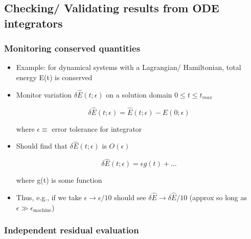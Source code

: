 \subsection{Checking/ Validating results from ODE integrators}

\subsubsection{Monitoring conserved quantities}
\begin{itemize}
    \item Example: for dynamical systems with a Lagrangian/ Hamiltonian, total energy E(t) is conserved

    \item Monitor variation $\delta \hat{E} (t;\epsilon)$ on a solution domain $0 \le t \le t_{max}$

    \[ \delta \hat{E}(t;\epsilon) = \hat{E}(t;\epsilon)-\hat{E}(0;\epsilon)\]

    where $\epsilon \equiv $ error tolerance for integrator 

    \item Should find that $\delta \hat{E}(t;\epsilon)$ is $O(\epsilon)$ 

    \[ \delta\hat{E}(t;\epsilon) = \epsilon g(t) + \ldots\]

    where g(t) is some function

    \item Thus, e.g., if we take $\epsilon\rightarrow\epsilon/10$ should see $\delta \hat{E} \rightarrow\delta\hat{E}/10 $ (approx so long as $\epsilon \gg \epsilon_{\text{machine}}$)
    
\end{itemize}

\subsubsection{Independent residual evaluation}

